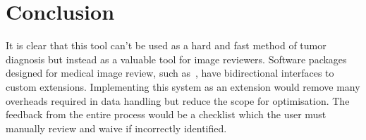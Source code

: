 \documentclass[journal]{IEEEtran}
\begin{document}
\section{Conclusion}
\label{sec:conclusion}

It is clear that this tool can't be used as a hard and fast method of tumor diagnosis but instead as a valuable tool for image reviewers.
Software packages designed for medical image review, such as~\cite{slicer}, have bidirectional interfaces to custom extensions.
Implementing this system as an extension would remove many overheads required in data handling but reduce the scope for optimisation.
The feedback from the entire process would be a checklist which the user must manually review and waive if incorrectly identified. 




\end{document}
